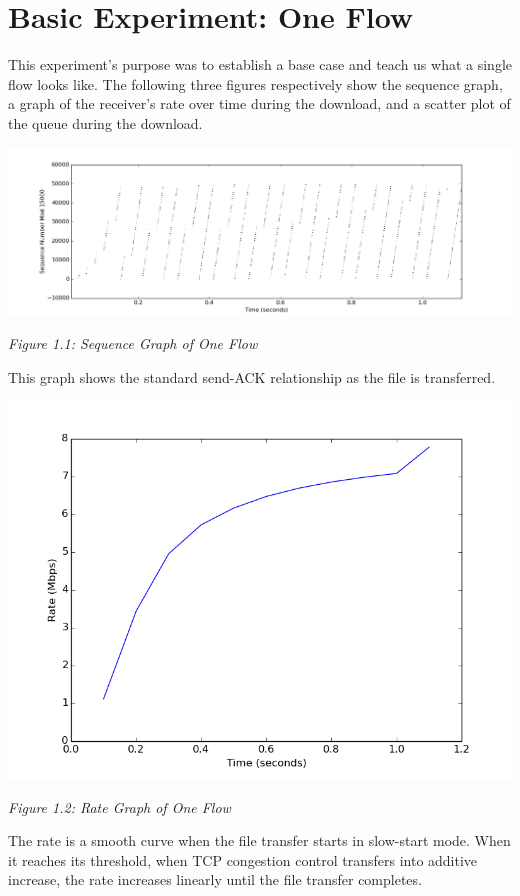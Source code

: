 \documentclass[11pt]{article}
\begin{document}


\section{Basic Experiment: One Flow}

This experiment's purpose was to establish a base case and teach us what a single flow looks like. The following three figures respectively show the sequence graph, a graph of the receiver's rate over time during the download, and a scatter plot of the queue during the download.

\includegraphics[width=17cm]{outputs/oneflow/oneflow_sequence.png}

\centerline{\emph{Figure 1.1: Sequence Graph of One Flow}}

This graph shows the standard send-ACK relationship as the file is transferred.


\includegraphics[width=17cm]{outputs/oneflow/oneflow_rate.png}

\centerline{\emph{Figure 1.2: Rate Graph of One Flow}}

The rate is a smooth curve when the file transfer starts in slow-start mode. When it reaches its threshold, when TCP congestion control transfers into additive increase, the rate increases linearly until the file transfer completes.
\end{document}

